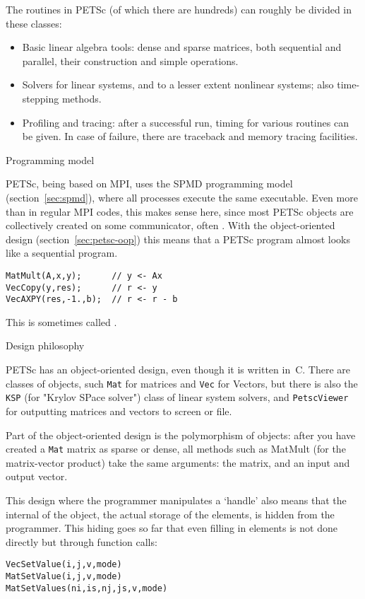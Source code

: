 The routines in PETSc (of which there are hundreds) can roughly be
divided in these classes:
\begin{itemize}
\item Basic linear algebra tools: dense and sparse matrices, both
  sequential and parallel, their construction and simple operations.
\item Solvers for linear systems, and to a lesser extent nonlinear
  systems; also time-stepping methods.
\item Profiling and tracing: after a successful run, timing for
  various routines can be given. In case of failure, there are
  traceback and memory tracing facilities.
\end{itemize}

 {Programming model}

PETSc, being based on MPI, uses the \ac{SPMD} programming model
(section~\ref{sec:spmd}), where all processes execute the same
executable. Even more than in regular MPI codes, this makes sense
here, since most PETSc objects are collectively created on some
communicator, often . With the
object-oriented design (section~\ref{sec:petsc-oop}) this means that a
PETSc program almost looks like a sequential program.
\begin{lstlisting}
MatMult(A,x,y);      // y <- Ax
VecCopy(y,res);      // r <- y
VecAXPY(res,-1.,b);  // r <- r - b
\end{lstlisting}
This is
sometimes called .

 {Design philosophy}
\label{sec:petsc-oop}

PETSc has an object-oriented design, even though it is written
in~C. There are classes of objects, such \lstinline{Mat} for
matrices and \lstinline{Vec} for Vectors, but there is also the
\lstinline{KSP} (for "Krylov SPace solver") class of linear system solvers, and
\lstinline{PetscViewer} for outputting matrices and vectors to screen or file.

Part of the object-oriented design is the polymorphism of objects:
after you have created a \lstinline{Mat} matrix as sparse or dense, all methods
such as MatMult (for the matrix-vector product) take the same
arguments: the matrix, and an input and output vector.

This design where the programmer manipulates a `handle' also means
that the internal of the object, the actual storage of the elements,
is hidden from the programmer. This hiding goes so far that even
filling in elements is not done directly but through function calls:
\begin{lstlisting}
VecSetValue(i,j,v,mode)
MatSetValue(i,j,v,mode)
MatSetValues(ni,is,nj,js,v,mode)
\end{lstlisting}

